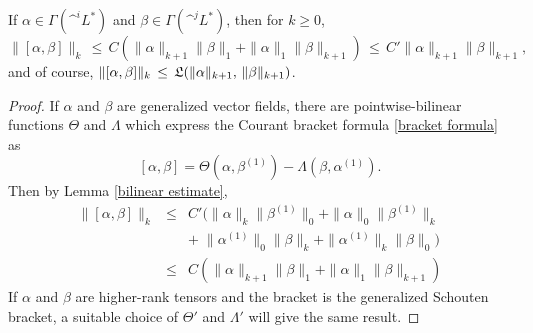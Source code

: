 \documentclass{article}
\begin{document}
\begin{lem}\label{bracket estimate}
If $\alpha\in \Gamma(\^ ^i L^*)$ and $\beta\in \Gamma(\^ ^j L^*)$, then for $k\geq0$,
$$\|[\alpha,\beta]\|_k \,\leq\, C \left(\|\alpha\|_{k+1} \|\beta\|_1 + \|\alpha\|_1 \|\beta\|_{k+1}\right) \,\leq\, C' \|\alpha\|_{k+1} \|\beta\|_{k+1},$$
and of course, $\|[\alpha,\beta]\|_k \,\leq\, \mathfrak{L}(\|\alpha\|_{k+1},\, \|\beta\|_{k+1})$.
\end{lem}
\begin{proof}
If $\alpha$ and $\beta$ are generalized vector fields, there are pointwise-bilinear functions $\Theta$ and $\Lambda$ which express the Courant bracket formula \eqref{bracket formula} as
$$[\alpha,\beta] = \Theta(\alpha,\beta^{(1)}) - \Lambda(\beta,\alpha^{(1)}).$$
Then by Lemma \ref{bilinear estimate},
\begin{eqnarray*}
\|[\alpha,\beta]\|_k &\leq& C' (\|\alpha\|_k \|\beta^{(1)}\|_0 + \|\alpha\|_0 \|\beta^{(1)}\|_k \\
& & +\; \|\alpha^{(1)}\|_0 \|\beta\|_k + \|\alpha^{(1)}\|_k \|\beta\|_0 ) \\
&\leq& C \left(\|\alpha\|_{k+1} \|\beta\|_1 + \|\alpha\|_1 \|\beta\|_{k+1}\right)
\end{eqnarray*}
If $\alpha$ and $\beta$ are higher-rank tensors and the bracket is the generalized Schouten bracket, a suitable choice of $\Theta'$ and $\Lambda'$ will give the same result.
\end{proof}

\end{document}
